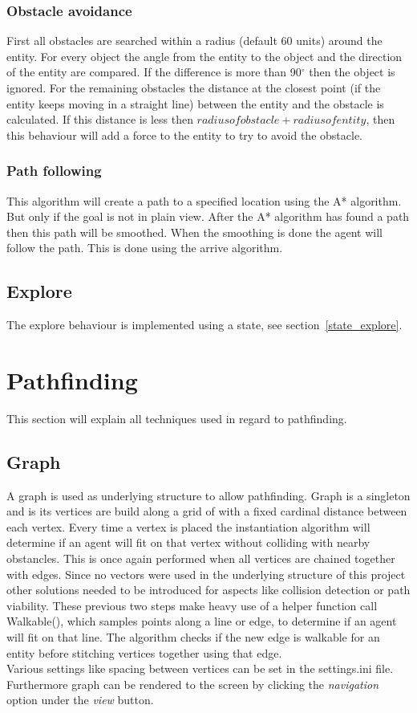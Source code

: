 \documentclass[10pt]{extarticle} %
\begin{document}
  \subsubsection {Obstacle avoidance}
  First all obstacles are searched within a radius (default 60 units) around the entity. For every object the angle from the entity to the object and the direction of the entity are compared. If the difference is more than 90$^{\circ}$ then the object is ignored. For the remaining obstacles the distance at the closest point (if the entity keeps moving in a straight line) between the entity and the obstacle is calculated. If this distance is less then \(radius of obstacle + radius of entity\), then this behaviour will add a force to the entity to try to avoid the obstacle.
  \subsubsection {Path following}
   This algorithm will create a path to a specified location using the A* algorithm. But only if the goal is not in plain view. After the A* algorithm has found a path then this path will be smoothed. When the smoothing is done the agent will follow the path. This is done using the arrive algorithm. 
   \subsection {Explore}
   The explore behaviour is implemented using a state, see section~\ref{state_explore}.
   \newpage
   
   \section {Pathfinding}
This section will explain all techniques used in regard to pathfinding.
   \subsection {Graph}
  A graph is used as underlying structure to allow pathfinding. Graph is a singleton and is its vertices are build along a grid of with a fixed cardinal distance between each vertex. Every time a vertex is placed the instantiation algorithm will determine if an agent will fit on that vertex without colliding with nearby obstancles. This is once again performed when all vertices are chained together with edges. Since no vectors were used in the underlying structure of this project other solutions needed to be introduced for aspects like collision detection or path viability. These previous two steps make heavy use of a helper function call Walkable(), which samples points along a line or edge, to determine if an agent will fit on that line\cite{tmrp}. The algorithm checks if the new edge is walkable for an entity before stitching vertices together using that edge.\\
   Various settings like spacing between vertices can be set in the settings.ini file. Furthermore graph can be rendered to the screen by clicking the \emph{navigation} option under the \emph{view} button.
\end{document}
